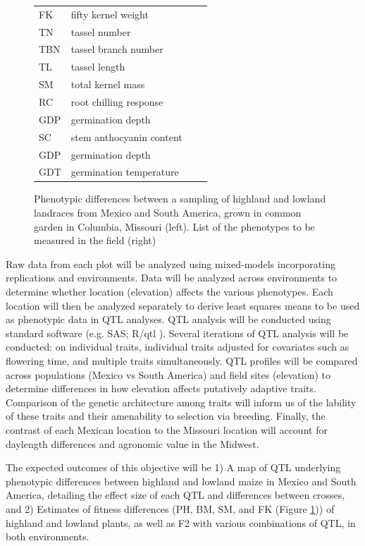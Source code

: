 \begin{figure}[ht!]
\begin{minipage}[c]{0.50\textwidth}
\begin{tabular}{llcc}
		FK & fifty kernel weight \\
		TN & tassel number \\
		TBN & tassel branch number \\
		TL & tassel length \\
		SM & total kernel mass \\
		RC & root chilling response \\
		GDP & germination depth \\
		SC & stem anthocyanin content \\
		GDP & germination depth \\
		GDT & germination temperature \\\bottomrule
		\end{tabular}
	\end{minipage}
 	\caption{ Phenotypic differences between a sampling of highland and lowland landraces from Mexico and South America, grown in common garden in Columbia, Missouri (left). List of the phenotypes to be measured in the field (right) }%
	\label{fig:phenos}
\end{figure}

Raw data from each plot will be analyzed using mixed-models incorporating replications and environments.  Data will be analyzed across environments to determine whether location (elevation) affects the various phenotypes.  Each location will then be analyzed separately to derive least squares means to be used as  phenotypic data in QTL analyses.  QTL analysis will be conducted using standard software (e.g. SAS; R/qtl \citealp{Broman2003a}).  Several iterations of QTL analysis will be conducted: on individual traits, individual traits adjusted for covariates such as flowering time, and multiple traits simultaneously.   QTL profiles will be compared across populations (Mexico vs South America) and field sites (elevation) to determine differences in how elevation affects putatively adaptive traits.  Comparison of the genetic architecture among traits will inform us of the lability of these traits and their amenability to selection via breeding.  Finally, the contrast of each Mexican location to the Missouri location will account for daylength differences and agronomic value in the Midwest. 

The expected outcomes of this objective will be 1) A map of QTL underlying phenotypic differences between highland and lowland maize in Mexico and South America, detailing the effect size of each QTL and differences between crosses, and 2) Estimates of fitness differences (PH, BM, SM, and FK (Figure \ref{fig:phenos})) of highland and lowland plants, as well as F2 with various combinations of QTL, in both environments. 

